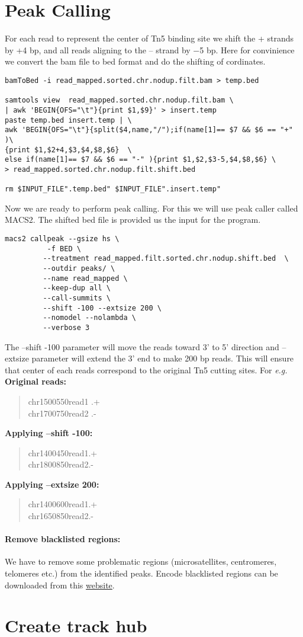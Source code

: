 \documentclass[10pt]{article}
\newcommand\tab[1][1cm]{\hspace*{#1}}
\begin{document}
\section{Peak Calling} For each read to represent the center of Tn5 binding site we shift the + strands by +4 bp, and all reads aligning to the – strand by −5 bp. Here for convinience we convert the bam file to bed format and do the shifting of cordinates.
\begin{verbatim}
bamToBed -i read_mapped.sorted.chr.nodup.filt.bam > temp.bed

samtools view  read_mapped.sorted.chr.nodup.filt.bam \
| awk 'BEGIN{OFS="\t"}{print $1,$9}' > insert.temp
paste temp.bed insert.temp | \
awk 'BEGIN{OFS="\t"}{split($4,name,"/");if(name[1]== $7 && $6 == "+" )\
{print $1,$2+4,$3,$4,$8,$6}  \
else if(name[1]== $7 && $6 == "-" ){print $1,$2,$3-5,$4,$8,$6} \
> read_mapped.sorted.chr.nodup.filt.shift.bed

rm $INPUT_FILE".temp.bed" $INPUT_FILE".insert.temp"
\end{verbatim}
Now we are ready to perform peak calling. For this we will use  peak caller called MACS2. The shifted bed file is provided us the input for the program.
\begin{verbatim}
macs2 callpeak --gsize hs \
	      -f BED \
         --treatment read_mapped.filt.sorted.chr.nodup.shift.bed  \
         --outdir peaks/ \
         --name read_mapped \
         --keep-dup all \
         --call-summits \
         --shift -100 --extsize 200 \
         --nomodel --nolambda \
         --verbose 3
\end{verbatim}
The --shift -100 parameter will move the reads toward 3' to 5' direction and --extsize parameter will extend the 3' end to make 200 bp reads. This will ensure that center of each reads correspond to the original Tn5 cutting sites. For {\em e.g.}
\textbf{Original reads:}
\begin{verse}
chr1\tab 500\tab 550\tab read1 \tab .\tab +\\
chr1\tab 700\tab 750\tab read2 \tab .\tab-
\end{verse}
\textbf{Applying --shift -100:}
\begin{verse}
chr1\tab 400\tab 450\tab read1\tab .\tab +\\
chr1\tab 800\tab 850\tab read2\tab .\tab -
\end{verse}
\textbf{Applying --extsize 200:}
\begin{verse}
chr1\tab 400\tab 600\tab read1\tab .\tab +\\
chr1\tab 650\tab 850\tab read2\tab .\tab -
\end{verse}
\paragraph{Remove blacklisted regions:} We have to remove some problematic regions (microsatellites, centromeres, telomeres etc.) from the identified peaks. Encode blacklisted regions can be downloaded from this \href{https://sites.google.com/site/anshulkundaje/projects/blacklists}{website}.
\section{Create track hub }
\end{document}
